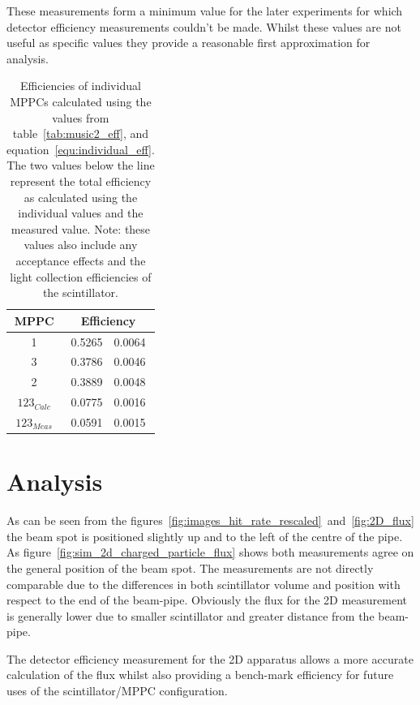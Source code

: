 These measurements form a minimum value for the later experiments for which detector efficiency measurements couldn't be made. Whilst these values are not useful as specific values they provide a reasonable first approximation for analysis.

\begin{table}
  \begin{center}
    \begin{tabular}{c|r@{\( \pm \)}l}
      MPPC  &  \multicolumn{2}{c}{Efficiency} \\
      \hline
      1  &  0.5265 & 0.0064  \\
      3  &  0.3786 & 0.0046  \\
      2  &  0.3889 & 0.0048  \\
      \hline
      \( 123_{Calc} \)  &  0.0775  &  0.0016  \\
      \( 123_{Meas} \)  &  0.0591  &  0.0015  \\
         
    \end{tabular}
  \end{center}
  \caption{Efficiencies of individual MPPCs calculated using the values from table~\ref{tab:music2_eff}, and equation~\eqref{equ:individual_eff}. The two values below the line represent the total efficiency as calculated using the individual values and the measured value. Note: these values also include any acceptance effects and the light collection efficiencies of the scintillator.}
  \label{tab:calculated_individual_eff}
\end{table}


\section{Analysis} %
\label{sec:analysis}
As can be seen from the figures~\ref{fig:images_hit_rate_rescaled}~and~\ref{fig:2D_flux} the beam spot is positioned slightly up and to the left of the centre of the pipe. As figure~\ref{fig:sim_2d_charged_particle_flux} shows both measurements agree on the general position of the beam spot. The measurements are not directly comparable due to the differences in both scintillator volume and position with respect to the end of the beam-pipe. Obviously the flux for the 2D measurement is generally lower due to smaller scintillator and greater distance from the beam-pipe.

The detector efficiency measurement for the 2D apparatus allows a more accurate calculation of the flux whilst also providing a bench-mark efficiency for future uses of the scintillator/MPPC configuration. 

